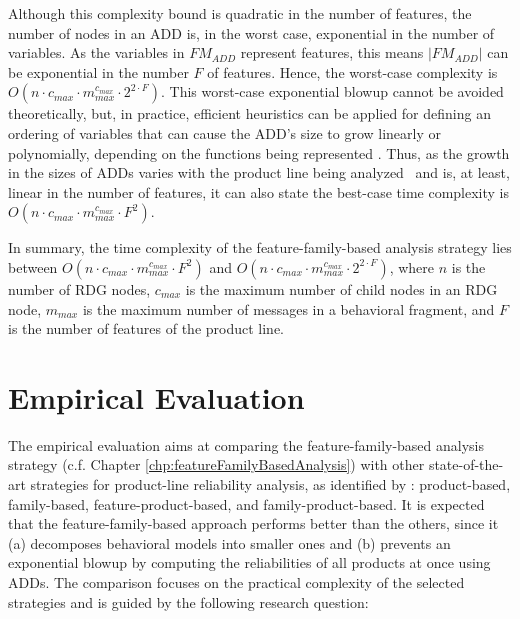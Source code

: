 Although this complexity bound is quadratic in the number of features, the
number of nodes in an ADD is, in the worst case, exponential in the number of
variables.  As the variables in $\mathit{FM_{ADD}}$ represent features, this
means $|\mathit{FM_{ADD}}|$ can be exponential in the number $F$ of features.
Hence, the worst-case complexity is $O(n \cdot c_{\mathit{max}} \cdot
m_{\mathit{max}}^{c_{\mathit{max}}} \cdot 2^{2 \cdot F})$.  This worst-case
exponential blowup cannot be avoided theoretically, but, in practice, efficient
heuristics can be applied for defining an ordering of variables that can cause
the ADD's size to grow linearly or polynomially, depending on the functions
being represented \cite{baier_principles_2008}.  Thus, as the growth in the
sizes of ADDs varies with the product line being
analyzed~\cite{liang_sat-based_2015} and is, at least, linear in the number of
features, it can also state the best-case time complexity is $O(n \cdot
c_{\mathit{max}} \cdot m_{\mathit{max}}^{c_{\mathit{max}}} \cdot F^2)$.

\begin{framed} In summary, the time complexity of the feature-family-based
	analysis strategy lies between $O(n \cdot c_{\mathit{max}} \cdot
	m_{\mathit{max}}^{c_{\mathit{max}}} \cdot F^2)$ and $O(n \cdot
	c_{\mathit{max}} \cdot m_{\mathit{max}}^{c_{\mathit{max}}} \cdot 2^{2
	\cdot F})$, where $n$ is the number of RDG nodes, $c_{max}$ is the
	maximum number of child nodes in an RDG node, $m_{max}$ is the maximum
	number of messages in a behavioral fragment, and $F$ is the number of
	features of the product line.  
\end{framed}









\section{Empirical Evaluation \label{subsec:empiricalEvaluation}}


The empirical evaluation aims at comparing the feature-family-based analysis
strategy (c.f. Chapter \ref{chp:featureFamilyBasedAnalysis}) with other
state-of-the-art strategies for product-line reliability analysis, as identified
by \citet{thum_classification_2014}: product-based, family-based,
fea\-ture-prod\-uct-based, and fam\-i\-ly-prod\-uct-based. It is expected that
the feature-family-based approach performs better than the others, since it (a)
decomposes behavioral models into smaller ones and (b) prevents an exponential
blowup by computing the reliabilities of all products at once using ADDs. The
comparison focuses on the practical complexity of the selected strategies and is
guided by the following research question:

